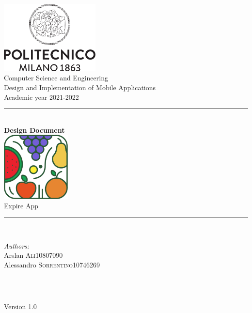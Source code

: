 \documentclass[a4paper,11pt]{report}
\begin{document}
\begin{titlepage}

\newcommand{\HRule}{\rule{\linewidth}{0.1mm}}

\center 

\includegraphics[width=50mm,scale=0.5]{./Images/Logo_Politecnico_Milano.png}\\[0.5cm] 

{\Large Computer Science and Engineering}\\[0.4cm] 
{\large Design and Implementation of Mobile Applications}\\[0.4cm] 
{\large Academic year 2021-2022}\\[0.5cm] 

\HRule \\[1 cm]
{\LARGE \textbf{Design Document}} \\[0.7cm]
\includegraphics[width=35mm,scale=0.5]{./Images/Logo/expiry_app_logo.png}\\[0.5cm] 
{\LARGE Expire App} \\[0.7cm]
\HRule \\[1cm]
\raggedright

\begin{minipage}{0.55\textwidth}
\begin{flushleft} \large
\emph{Authors:}\\
Arslan \textsc{Ali}\hfill 10807090 \\
Alessandro \textsc{Sorrentino}\hfill 10746269 \\
\end{flushleft}
\end{minipage}\\[0.7 cm]
~

\center

{\large Version 1.0}\\

\vfill 
\end{titlepage}

\newpage

\tableofcontents
{}
\listoftables
\newpage
\listoffigures
\newpage







\end{document}
